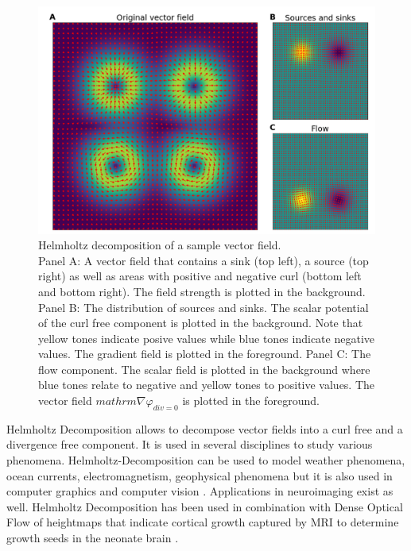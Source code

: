 \begin{figure}[!htb]
\centering
\includegraphics[width=\textwidth,height=\textheight,keepaspectratio]{Figures/helmholtz_decomposition}
\decoRule
\caption[Helmholtz decomposition of a sample vector field]{Helmholtz decomposition of a sample vector field.\\ Panel A: A vector field that contains a sink (top left), a source (top right) as well as areas with positive and negative curl (bottom left and bottom right). The field strength is plotted in the background. Panel B: The distribution of sources and sinks. The scalar potential of the curl free component is plotted in the background. Note that yellow tones indicate posive values while blue tones indicate negative values. The gradient field is plotted in the foreground. Panel C: The flow component. The scalar field is plotted in the background where blue tones relate to negative and yellow tones to positive values. The vector field $mathrm{\nabla}\varphi_{div=0}$ is plotted in the foreground.}
\label{fig:helmholtz_decomposition}
\end{figure}
Helmholtz Decomposition allows to decompose vector fields into a curl free and a divergence free component. It is used in several disciplines to study various phenomena. Helmholtz-Decomposition can be used to model weather phenomena, ocean currents, electromagnetism, geophysical phenomena but it is also used in computer graphics and computer vision \parencite{bhatia2012helmholtz}. Applications in neuroimaging exist as well. Helmholtz Decomposition has been used in combination with Dense Optical Flow of heightmaps that indicate cortical growth captured by MRI to determine growth seeds in the neonate brain \parencite{lefevre2009identification}. \\
